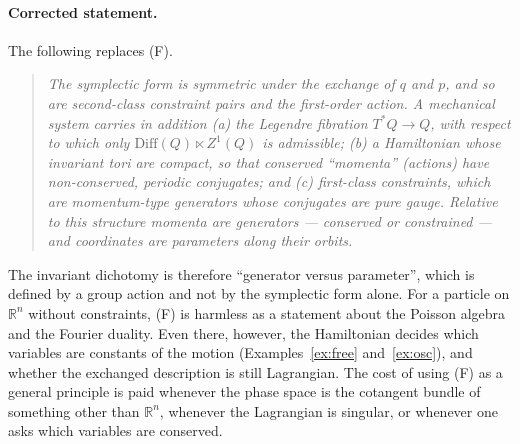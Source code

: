 \documentclass[11pt,a4paper]{article}
\theoremstyle{definition}
\theoremstyle{remark}
\newcommand{\R}{\mathbb{R}}
\begin{document}
\paragraph{Corrected statement.}
The following replaces (F).
\begin{quote}
\emph{The symplectic form is symmetric under the exchange of $q$ and $p$, and so are second-class constraint pairs and the first-order action. A mechanical system carries in addition (a) the Legendre fibration $T^*Q\to Q$, with respect to which only $\mathrm{Diff}(Q)\ltimes Z^1(Q)$ is admissible; (b) a Hamiltonian whose invariant tori are compact, so that conserved ``momenta'' (actions) have non-conserved, periodic conjugates; and (c) first-class constraints, which are momentum-type generators whose conjugates are pure gauge. Relative to this structure momenta are generators --- conserved or constrained --- and coordinates are parameters along their orbits.}
\end{quote}
The invariant dichotomy is therefore ``generator versus parameter'', which is defined by a group action and not by the symplectic form alone. For a particle on $\R^n$ without constraints, (F) is harmless as a statement about the Poisson algebra and the Fourier duality. Even there, however, the Hamiltonian decides which variables are constants of the motion (Examples~\ref{ex:free} and~\ref{ex:osc}), and whether the exchanged description is still Lagrangian. The cost of using (F) as a general principle is paid whenever the phase space is the cotangent bundle of something other than $\R^n$, whenever the Lagrangian is singular, or whenever one asks which variables are conserved.
\end{document}
